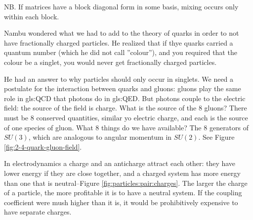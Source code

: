 \documentclass[]{article}
\begin{document}
NB. If matrices have a block diagonal form in some basis, mixing occurs only within each block.

Nambu wondered what we had to add to the theory of quarks in order to not have fractionally charged particles. He realized that if thye quarks carried a quantum number (which he did not call ''colour''), and you required that the colour be a singlet, you would never get fractionally charged particles.

He had an answer to why particles should only occur in singlets. We need a postulate for the interaction between quarks and gluons: gluons play the same role in \gls{gls:QCD} that photons do in \gls{gls:QED}. But photons couple to the electric field: the source of the field is charge. What is the source of the 8 gluons? There must be 8 conserved quantities, similar yo electric charge, and each is the source of one species of gluon. What 8 things do we have available? The 8 generators of $SU(3)$, which are analogous to angular momentum in $SU(2)$. See Figure \ref{fig:2-4-quark-gluon-field}.

In electrodynamics a charge and an anticharge attract each other: they have lower energy if they are close together, and a charged system has more energy than one that is neutral--Figure \ref{fig:particles:pair:charges}. The larger the charge of a particle, the more profitable it is to have a neutral system. If the coupling coefficient were mush higher than it is, it would be prohibitively expensive to have separate charges.
\end{document}
